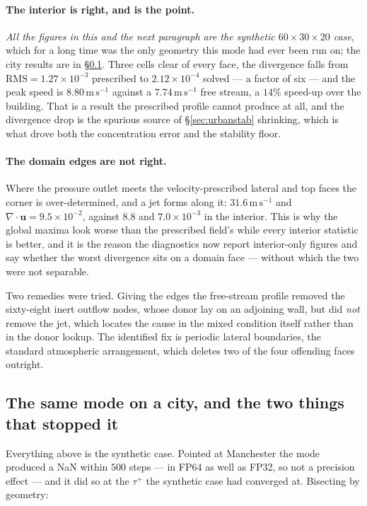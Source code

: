 \documentclass[11pt,a4paper]{article}
\newcommand{\uu}{\bm{u}}
\begin{document}
\paragraph{The interior is right, and is the point.} \emph{All the figures in
this and the next paragraph are the synthetic $60\times30\times20$ case}, which
for a long time was the only geometry this mode had ever been run on; the city
results are in \S\ref{sec:urbansolvedcity}. Three cells clear of every
face, the divergence falls from $\mathrm{RMS} = 1.27\times10^{-3}$ prescribed to
$2.12\times10^{-4}$ solved --- a factor of six --- and the peak speed is
$8.80\,\mathrm{m\,s^{-1}}$ against a $7.74\,\mathrm{m\,s^{-1}}$ free stream, a
$14\%$ speed-up over the building. That is a result the prescribed profile
cannot produce at all, and the divergence drop is the spurious source of
\S\ref{sec:urbanstab} shrinking, which is what drove both the concentration
error and the stability floor.

\paragraph{The domain edges are not right.} Where the pressure outlet meets the
velocity-prescribed lateral and top faces the corner is over-determined, and a
jet forms along it: $31.6\,\mathrm{m\,s^{-1}}$ and
$\nabla\!\cdot\!\uu = 9.5\times10^{-2}$, against $8.8$ and $7.0\times10^{-3}$
in the interior. This is why the global maxima look worse than the prescribed
field's while every interior statistic is better, and it is the reason the
diagnostics now report interior-only figures and say whether the worst
divergence sits on a domain face --- without which the two were not separable.

Two remedies were tried. Giving the edges the free-stream profile removed the
sixty-eight inert outflow nodes, whose donor lay on an adjoining wall, but did
\emph{not} remove the jet, which locates the cause in the mixed condition
itself rather than in the donor lookup. The identified fix is periodic lateral
boundaries, the standard atmospheric arrangement, which deletes two of the four
offending faces outright.

\subsection{The same mode on a city, and the two things that stopped it}
\label{sec:urbansolvedcity}

Everything above is the synthetic case. Pointed at Manchester the mode produced
a NaN within $500$ steps --- in FP64 as well as FP32, so not a precision effect
--- and it did so at the $\tau^+$ the synthetic case had converged at. Bisecting
by geometry:
\end{document}
